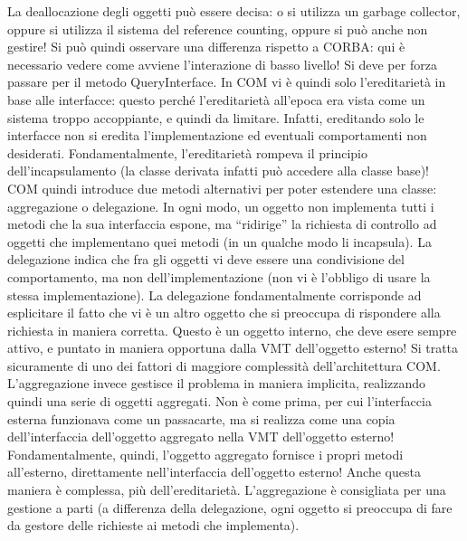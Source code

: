 La deallocazione degli oggetti può essere decisa: o si utilizza un garbage collector, oppure si utilizza il sistema del 
reference counting, oppure si può anche non gestire! Si può quindi osservare una differenza rispetto a CORBA: qui è
necessario vedere come avviene l'interazione di basso livello! Si deve per forza passare per il metodo QueryInterface.
In COM vi è quindi solo l'ereditarietà in base alle interfacce: questo perché l'ereditarietà all'epoca era vista come un 
sistema troppo accoppiante, e quindi da limitare. Infatti, ereditando solo le interfacce non si eredita 
l'implementazione ed eventuali comportamenti non desiderati. Fondamentalmente, l'ereditarietà rompeva il principio 
dell'incapsulamento (la classe derivata infatti può accedere alla classe base)!
COM quindi introduce due metodi alternativi per poter estendere una classe: aggregazione o delegazione. In ogni modo, un 
oggetto non implementa tutti i metodi che la sua interfaccia espone, ma ``ridirige'' la richiesta di controllo ad
oggetti che implementano quei metodi (in un qualche modo li incapsula).
La delegazione indica che fra gli oggetti vi deve essere una condivisione del comportamento, ma non dell'implementazione 
(non vi è l'obbligo di usare la stessa implementazione). La delegazione fondamentalmente corrisponde ad esplicitare il 
fatto che vi è un altro oggetto che si preoccupa di rispondere alla richiesta in maniera corretta. Questo è un oggetto 
interno, che deve esere sempre attivo, e puntato in maniera opportuna dalla VMT dell'oggetto esterno!
Si tratta sicuramente di uno dei fattori di maggiore complessità dell'architettura COM.
L'aggregazione invece gestisce il problema in maniera implicita, realizzando quindi una serie di oggetti aggregati. Non 
è come prima, per cui l'interfaccia esterna funzionava come un passacarte, ma si realizza come una copia 
dell'interfaccia dell'oggetto aggregato nella VMT dell'oggetto esterno! Fondamentalmente, quindi, l'oggetto aggregato 
fornisce i propri metodi all'esterno, direttamente nell'interfaccia dell'oggetto esterno! Anche questa maniera è 
complessa, più dell'ereditarietà. L'aggregazione è consigliata per una gestione a parti (a differenza della delegazione, 
ogni oggetto si preoccupa di fare da gestore delle richieste ai metodi che implementa).
